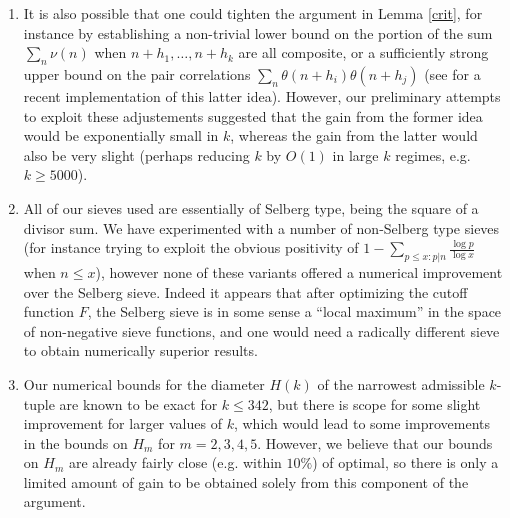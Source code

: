 \begin{enumerate}
\item It is also possible that one could tighten the argument in Lemma \ref{crit}, for instance by establishing a non-trivial lower bound on the portion of the sum $\sum_n \nu(n)$ when $n+h_1,\dots,n+h_k$ are all composite, or a sufficiently strong upper bound on the pair correlations $\sum_n \theta(n+h_i) \theta(n+h_j)$ (see \cite[\S 6]{banks} for a recent implementation of this latter idea).  However, our preliminary attempts to exploit these adjustements suggested that the gain from the former idea would be exponentially small in $k$, whereas the gain from the latter would also be very slight (perhaps reducing $k$ by $O(1)$ in large $k$ regimes, e.g. $k \geq 5000$).
\item All of our sieves used are essentially of Selberg type, being the square of a divisor sum.  We have experimented with a number of non-Selberg type sieves (for instance trying to exploit the obvious positivity of $1 - \sum_{p \leq x: p|n} \frac{\log p}{\log x}$ when $n \leq x$), however none of these variants offered a numerical improvement over the Selberg sieve.  Indeed it appears that after optimizing the cutoff function $F$, the Selberg sieve is in some sense a ``local maximum'' in the space of non-negative sieve functions, and one would need a radically different sieve to obtain numerically superior results.
\item Our numerical bounds for the diameter $H(k)$ of the narrowest admissible $k$-tuple are known to be exact for $k \leq 342$, but there is scope for some slight improvement for larger values of $k$, which would lead to some improvements in the bounds on $H_m$ for $m=2,3,4,5$.  However, we believe that our bounds on $H_m$ are already fairly close (e.g. within $10\%$) of optimal, so there is only a limited amount of gain to be obtained solely from this component of the argument.
\end{enumerate}
